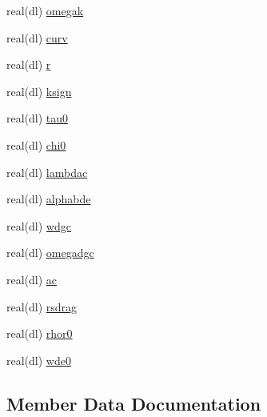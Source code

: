 \begin{DoxyCompactItemize}
\item 
real(dl) \mbox{\hyperlink{structmodelparams_1_1cambparams_a81e806376729a1760840157147b1c987}{omegak}}
\item 
real(dl) \mbox{\hyperlink{structmodelparams_1_1cambparams_ac2a9572bf98b89fb82cd2c3c6db743b2}{curv}}
\item 
real(dl) \mbox{\hyperlink{structmodelparams_1_1cambparams_a852a8cf2f135e145fa6e021abcb5dd67}{r}}
\item 
real(dl) \mbox{\hyperlink{structmodelparams_1_1cambparams_a74da1ba0eeea4e3f7dd6eeb8b977cfa7}{ksign}}
\item 
real(dl) \mbox{\hyperlink{structmodelparams_1_1cambparams_ab26b5b9881a3bdea81d14c78a2ea6187}{tau0}}
\item 
real(dl) \mbox{\hyperlink{structmodelparams_1_1cambparams_af3649a91caa23e0631c8005d4e0ecfc9}{chi0}}
\item 
real(dl) \mbox{\hyperlink{structmodelparams_1_1cambparams_af43e82299841bbbd4f81edd0a8f88b95}{lambdac}}
\item 
real(dl) \mbox{\hyperlink{structmodelparams_1_1cambparams_ae7ab7df325a24b5858753274f831d7b8}{alphabde}}
\item 
real(dl) \mbox{\hyperlink{structmodelparams_1_1cambparams_a78bfb376426165469779c263a1d7bf9a}{wdgc}}
\item 
real(dl) \mbox{\hyperlink{structmodelparams_1_1cambparams_a2f7c71d6596e7cf9a5e1202d427cbed2}{omegadgc}}
\item 
real(dl) \mbox{\hyperlink{structmodelparams_1_1cambparams_ab9f941b0b837b4339faac68d74057a6a}{ac}}
\item 
real(dl) \mbox{\hyperlink{structmodelparams_1_1cambparams_a8e695996e3e3cb30366e2bf5dfd5d188}{rsdrag}}
\item 
real(dl) \mbox{\hyperlink{structmodelparams_1_1cambparams_a80f541885dbba526bba7f1acaf41531a}{rhor0}}
\item 
real(dl) \mbox{\hyperlink{structmodelparams_1_1cambparams_aee77725f02becd9f9747c9ce966efa95}{wde0}}
\end{DoxyCompactItemize}


\subsection{Member Data Documentation}
\mbox{\label{structmodelparams_1_1cambparams_ab9f941b0b837b4339faac68d74057a6a}} 
